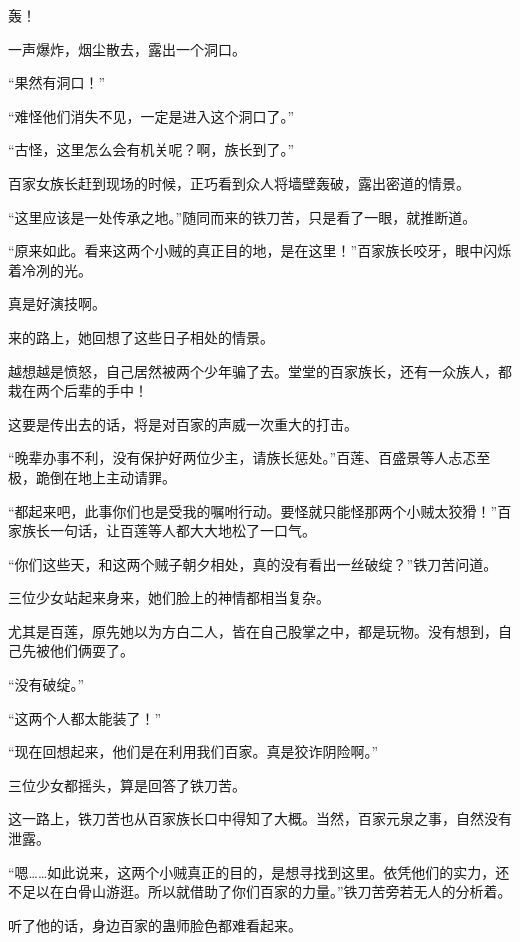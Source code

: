 
\begin{this_body}

轰！

一声爆炸，烟尘散去，露出一个洞口。

“果然有洞口！”

“难怪他们消失不见，一定是进入这个洞口了。”

“古怪，这里怎么会有机关呢？啊，族长到了。”

百家女族长赶到现场的时候，正巧看到众人将墙壁轰破，露出密道的情景。

“这里应该是一处传承之地。”随同而来的铁刀苦，只是看了一眼，就推断道。

“原来如此。看来这两个小贼的真正目的地，是在这里！”百家族长咬牙，眼中闪烁着冷冽的光。

真是好演技啊。

来的路上，她回想了这些日子相处的情景。

越想越是愤怒，自己居然被两个少年骗了去。堂堂的百家族长，还有一众族人，都栽在两个后辈的手中！

这要是传出去的话，将是对百家的声威一次重大的打击。

“晚辈办事不利，没有保护好两位少主，请族长惩处。”百莲、百盛景等人忐忑至极，跪倒在地上主动请罪。

“都起来吧，此事你们也是受我的嘱咐行动。要怪就只能怪那两个小贼太狡猾！”百家族长一句话，让百莲等人都大大地松了一口气。

“你们这些天，和这两个贼子朝夕相处，真的没有看出一丝破绽？”铁刀苦问道。

三位少女站起来身来，她们脸上的神情都相当复杂。

尤其是百莲，原先她以为方白二人，皆在自己股掌之中，都是玩物。没有想到，自己先被他们俩耍了。

“没有破绽。”

“这两个人都太能装了！”

“现在回想起来，他们是在利用我们百家。真是狡诈阴险啊。”

三位少女都摇头，算是回答了铁刀苦。

这一路上，铁刀苦也从百家族长口中得知了大概。当然，百家元泉之事，自然没有泄露。

“嗯……如此说来，这两个小贼真正的目的，是想寻找到这里。依凭他们的实力，还不足以在白骨山游逛。所以就借助了你们百家的力量。”铁刀苦旁若无人的分析着。

听了他的话，身边百家的蛊师脸色都难看起来。


\end{this_body}
